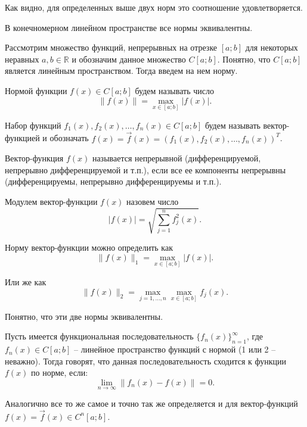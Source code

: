 Как видно, для определенных выше двух норм это соотношение удовлетворяется.

\begin{proposition}
	В конечномерном линейном пространстве все нормы эквивалентны.
\end{proposition}

Рассмотрим множество функций, непрерывных на отрезке $[a; b]$ для некоторых неравных $a, b \in \mathbb{R}$ и обозначим данное множество $C[a; b]$. Понятно, что $C[a; b]$ является линейным пространством. Тогда введем на нем норму.

\begin{definition}
	Нормой функции $f(x) \in C[a; b]$ будем называть число $$\|f(x)\| = \max_{x \in [a; b]}|f(x)|.$$
\end{definition}

\begin{definition}
	Набор функций $f_1(x), f_2(x), \dots, f_n(x) \in C[a; b]$ будем называть вектор-функцией и обозначать $f(x) = \vec{f}(x) = \left(f_1(x), f_2(x), \dots, f_n(x)\right)^T$.
\end{definition}

\begin{definition}
	Вектор-функция $f(x)$ называется непрерывной (дифференцируемой, непрерывно дифференцируемой и т.п.), если все ее компоненты непрерывны (дифференцируемы, непрерывно дифференцируемы и т.п.).
\end{definition}

\begin{definition}
	Модулем вектор-функции $f(x)$ назовем число
	\begin{equation}
		|f(x)| = \sqrt{\sum_{j = 1}^{n} f_j^2(x) }.
	\end{equation}
\end{definition}

Норму вектор-функции можно определить как $$\|f(x)\|_1 = \max_{x \in [a; b]}|f(x)|.$$

Или же как $$\|f(x)\|_2 = \max_{j = 1, \dots, n} \max_{x \in [a; b]} f_j(x).$$

Понятно, что эти две нормы эквивалентны.

\begin{definition}
	Пусть имеется функциональная последовательность $\{f_n(x)\}_{n = 1}^{\infty}$, где $f_n(x) \in C[a; b]$ -- линейное пространство функций с нормой (1 или 2 -- неважно). Тогда говорят, что данная последовательность сходится к функции $f(x)$ по норме, если:
	\begin{equation}
		\lim\limits_{n\rightarrow \infty} \|f_n(x) - f(x)\| = 0.
	\end{equation}

Аналогично все то же самое и точно так же определяется и для вектор-функций $f(x) = \vec{f}(x) \in C^n[a; b]$.
\end{definition}

